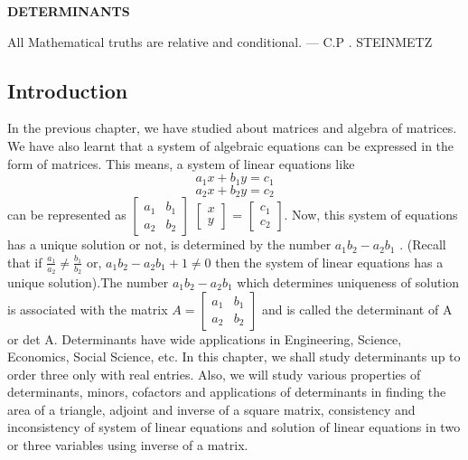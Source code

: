 \documentclass{article}
\begin{document}
\begin{center}
\large{\textbf{DETERMINANTS}}
\end{center}

All Mathematical truths are relative and conditional. — C.P . STEINMETZ
\subsection{Introduction}
  
In the previous chapter, we have studied about matrices and algebra of matrices. We have also learnt that a system of algebraic equations can be expressed in the form of matrices. This means, a system of linear equations like
\newline
\newline
\[a_1 x + b_1 y = c_1\]
\newline
\newline
\[a_2 x + b_2 y = c_2\]
\newline
\newline
can be represented as  $\begin{bmatrix}
a_1 & b_1 \\
a_2 & b_2
\end{bmatrix}$
$\begin{bmatrix}
x \\
y
\end{bmatrix}$ = 
$\begin{bmatrix}
c_1 \\
c_2
\end{bmatrix}$.
Now, this system of equations has a unique solution or not, is
determined by the number
$a_1 b_2 - a_2 b_1$ . (Recall that if  $\frac{a_1}{a_2} \neq \frac{b_1}{b_2}$ or, $a_1b_2-a_2b_1+1\neq0$ then the system of linear equations has a unique solution).The number $a_1 b_2-a_2 b_1$
which determines uniqueness of solution is associated with the matrix $A = \begin{bmatrix}
    a_1 & b_1 \\
    a_2 & b_2
\end{bmatrix}$
and is called the determinant of A or det A. Determinants have wide applications in
Engineering, Science, Economics, Social Science, etc.
In this chapter, we shall study determinants up to order three only with real entries.
Also, we will study various properties of determinants, minors, cofactors and applications of determinants in finding the area of a triangle, adjoint and inverse of a square matrix, consistency and inconsistency of system of linear equations and solution of linear equations in two or three variables using inverse of a matrix.
\end{document}

